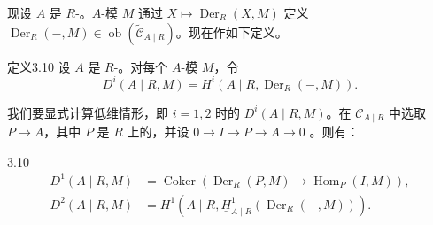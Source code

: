 现设 $A$ 是 $R$-。$A$-模 $M$ 通过 $X\mapsto\operatorname{Der}_R(X,M)$ 定义 $\operatorname{Der}_R(-,M)\in\operatorname{ob}(\widetilde{\mathcal C}_{A\mid R})$。现在作如下定义。
\begin{SGAresult}{定义}{3.10}
设 $A$ 是 $R$-。对每个 $A$-模 $M$，令
\[D^i(A\mid R,M)=H^i(A\mid R,\operatorname{Der}_R(-,M)).\]
\end{SGAresult}
我们要显式计算低维情形，即 $i=1,2$ 时的 $D^i(A\mid R,M)$。在 $\mathcal C_{A\mid R}$ 中选取 $P\to A$，其中 $P$ 是 $R$ 上的，并设 $0\to I\to P\to A\to0$ 。则有：
\begin{SGAresult}{}{3.10}
\[
\begin{aligned}
D^1(A\mid R,M)&=\operatorname{Coker}(\operatorname{Der}_R(P,M)\to\operatorname{Hom}_P(I,M)),\\
D^2(A\mid R,M)&=H^1(A\mid R,\underline H^1_{A\mid R}(\operatorname{Der}_R(-,M))).
\end{aligned}
\]
\end{SGAresult}
